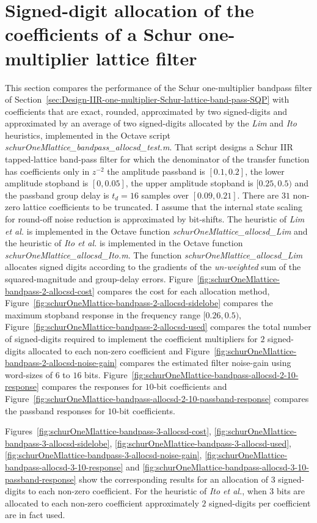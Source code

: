 \documentclass[a4paper,twoside,10pt,english]{report}
\begin{document}
\section{Signed-digit allocation of the coefficients of a Schur one-multiplier lattice filter}
This section compares the performance of the Schur one-multiplier bandpass
filter of
Section~\ref{sec:Design-IIR-one-multiplier-Schur-lattice-band-pass-SQP} with
coefficients that are exact, rounded, approximated by two signed-digits and
approximated by an average of two signed-digits allocated by the \emph{Lim} and
\emph{Ito} heuristics, implemented in the Octave script
\emph{schurOneMlattice\_bandpass\_allocsd\_test.m}. That script designs a Schur
IIR tapped-lattice band-pass filter for which the denominator of the transfer
function has coefficients only in $z^{-2}$ the amplitude passband is
$[0.1,0.2]$, the lower amplitude stopband is $[0, 0.05]$, the upper amplitude 
stopband is $[0.25,0.5)$ and the passband group delay is $t_{d}=16$ samples over
$[0.09,0.21]$. There are $31$ non-zero lattice coefficients to be truncated. I 
assume that the internal state scaling for round-off noise reduction is 
approximated by bit-shifts. The heuristic of \emph{Lim et al.} is implemented 
in the Octave function \emph{schurOneMlattice\_allocsd\_Lim} and the heuristic
of \emph{Ito et al.} is implemented in the Octave function 
\emph{schurOneMlattice\_allocsd\_Ito.m}. The
function \emph{schurOneMlattice\_allocsd\_Lim} allocates signed digits 
according to the gradients of the \emph{un-weighted} sum of the
squared-magnitude and group-delay errors.
Figure~\ref{fig:schurOneMlattice-bandpass-2-allocsd-cost}
compares the cost for each allocation method,
Figure~\ref{fig:schurOneMlattice-bandpass-2-allocsd-sidelobe} compares
the maximum stopband response in the frequency range $[0.26,0.5)$,
Figure~\ref{fig:schurOneMlattice-bandpass-2-allocsd-used} compares the total
number of signed-digits required to implement the coefficient multipliers for
$2$ signed-digits allocated to each non-zero coefficient and
Figure~\ref{fig:schurOneMlattice-bandpass-2-allocsd-noise-gain} compares the 
estimated filter noise-gain using word-sizes of $6$ to $16$ bits. 
Figure~\ref{fig:schurOneMlattice-bandpass-allocsd-2-10-response} compares the
responses for $10$-bit coefficients and
Figure~\ref{fig:schurOneMlattice-bandpass-allocsd-2-10-passband-response}
compares the passband responses for $10$-bit coefficients.

Figures~\ref{fig:schurOneMlattice-bandpass-3-allocsd-cost},
\ref{fig:schurOneMlattice-bandpass-3-allocsd-sidelobe},
\ref{fig:schurOneMlattice-bandpass-3-allocsd-used},
\ref{fig:schurOneMlattice-bandpass-3-allocsd-noise-gain},
\ref{fig:schurOneMlattice-bandpass-allocsd-3-10-response} and
\ref{fig:schurOneMlattice-bandpass-allocsd-3-10-passband-response} show the 
corresponding results for an allocation of $3$ signed-digits to each non-zero 
coefficient. For the heuristic of \emph{Ito et al.}, when $3$ bits are 
allocated to each non-zero coefficient approximately $2$ signed-digits per
coefficient are in fact used. 
\end{document}
